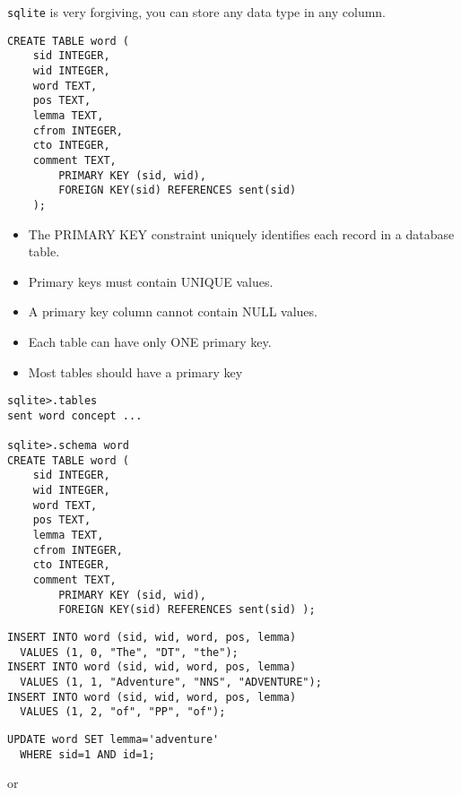 \documentclass[a4paper,landscape,headrule,footrule,dvips]{foils}
\begin{document}
\begin{CJK}{UTF8}{min}
\texttt{sqlite} is very forgiving, you can store any data type in any column. 


\begin{verbatim}
CREATE TABLE word (
	sid INTEGER,
	wid INTEGER,
	word TEXT,
	pos TEXT,
	lemma TEXT,
	cfrom INTEGER,
	cto INTEGER,
	comment TEXT,
        PRIMARY KEY (sid, wid),
        FOREIGN KEY(sid) REFERENCES sent(sid)
	);
\end{verbatim}
\begin{itemize}
\item The PRIMARY KEY constraint uniquely identifies each record in a database table.
\item Primary keys must contain UNIQUE values.
\item A primary key column cannot contain NULL values.
\item Each table can have only ONE primary key.
\item Most tables should have a primary key
\end{itemize}


\begin{verbatim}
sqlite>.tables
sent word concept ...

sqlite>.schema word
CREATE TABLE word (
	sid INTEGER,
	wid INTEGER,
	word TEXT,
	pos TEXT,
	lemma TEXT,
	cfrom INTEGER,
	cto INTEGER,
	comment TEXT,
        PRIMARY KEY (sid, wid),
        FOREIGN KEY(sid) REFERENCES sent(sid) );
\end{verbatim}


\begin{verbatim}
INSERT INTO word (sid, wid, word, pos, lemma)  
  VALUES (1, 0, "The", "DT", "the");
INSERT INTO word (sid, wid, word, pos, lemma)  
  VALUES (1, 1, "Adventure", "NNS", "ADVENTURE");
INSERT INTO word (sid, wid, word, pos, lemma)  
  VALUES (1, 2, "of", "PP", "of");
\end{verbatim}


\begin{verbatim}
UPDATE word SET lemma='adventure'
  WHERE sid=1 AND id=1;
\end{verbatim}

or


\end{CJK}
\end{document}
